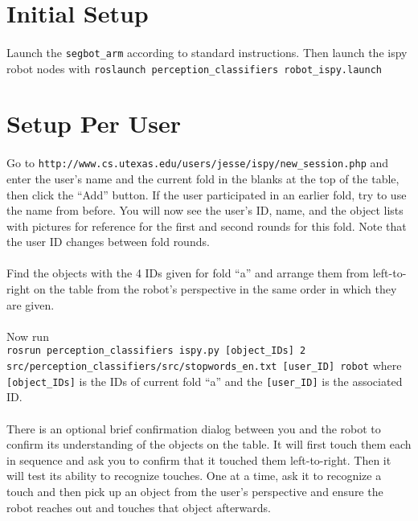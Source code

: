 \documentclass{article}
\begin{document}
\section{Initial Setup}

\paragraph{} Launch the \texttt{segbot\_arm} according to standard instructions. Then launch the ispy robot nodes with \texttt{roslaunch perception\_classifiers robot\_ispy.launch}

\section{Setup Per User}

\paragraph{} Go to \texttt{http://www.cs.utexas.edu/users/jesse/ispy/new\_session.php} and enter the user's name and the current fold in the blanks at the top of the table, then click the ``Add'' button. If the user participated in an earlier fold, try to use the name from before. You will now see the user's ID, name, and the object lists with pictures for reference for the first and second rounds for this fold. Note that the user ID changes between fold rounds.

\paragraph{} Find the objects with the 4 IDs given for fold ``a'' and arrange them from left-to-right on the table from the robot's perspective in the same order in which they are given.

\paragraph{} Now run\\ \texttt{rosrun perception\_classifiers ispy.py [object\_IDs] 2 src/perception\_classifiers/src/stopwords\_en.txt [user\_ID] robot}
where \texttt{[object\_IDs]} is the IDs of current fold ``a'' and the \texttt{[user\_ID]} is the associated ID.

\paragraph{} There is an optional brief confirmation dialog between you and the robot to confirm its understanding of the objects on the table. It will first touch them each in sequence and ask you to confirm that it touched them left-to-right. Then it will test its ability to recognize touches. One at a time, ask it to recognize a touch and then pick up an object from the user's perspective and ensure the robot reaches out and touches that object afterwards.
\end{document}
